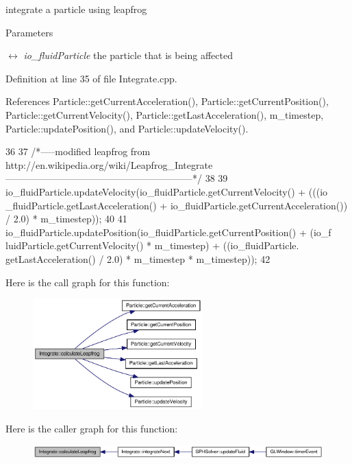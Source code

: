 integrate a particle using leapfrog 


\begin{DoxyParams}{Parameters}
\item[\mbox{$\leftrightarrow$} {\em io\_\-fluidParticle}]the particle that is being affected \end{DoxyParams}


Definition at line 35 of file Integrate.cpp.



References Particle::getCurrentAcceleration(), Particle::getCurrentPosition(), Particle::getCurrentVelocity(), Particle::getLastAcceleration(), m\_\-timestep, Particle::updatePosition(), and Particle::updateVelocity().




\begin{DoxyCode}
36 {
37     /*-----modified leapfrog from http://en.wikipedia.org/wiki/Leapfrog_Integrate
      -----------------------------------------------------------*/
38 
39     io_fluidParticle.updateVelocity(io_fluidParticle.getCurrentVelocity() + (((io
      _fluidParticle.getLastAcceleration() + io_fluidParticle.getCurrentAcceleration())
       / 2.0) * m_timestep));
40 
41     io_fluidParticle.updatePosition(io_fluidParticle.getCurrentPosition() + (io_f
      luidParticle.getCurrentVelocity() * m_timestep) + ((io_fluidParticle.
      getLastAcceleration() / 2.0) * m_timestep * m_timestep));
42 }
\end{DoxyCode}




Here is the call graph for this function:\nopagebreak
\begin{figure}[H]
\begin{center}
\leavevmode
\includegraphics[width=185pt]{class_integrate_aec359fd96ecbce78f7fb042798402665_cgraph}
\end{center}
\end{figure}




Here is the caller graph for this function:\nopagebreak
\begin{figure}[H]
\begin{center}
\leavevmode
\includegraphics[width=320pt]{class_integrate_aec359fd96ecbce78f7fb042798402665_icgraph}
\end{center}
\end{figure}


